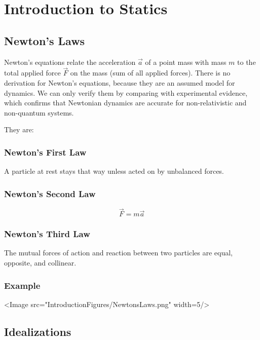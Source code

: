 \section{Introduction to Statics}

\subsection{Newton's Laws}



Newton's equations relate the acceleration $\vec{a}$ of a point mass with mass $m$ to the total applied force $\vec{F}$ on the mass (sum of all applied forces). There is no derivation for Newton's equations, because they are an assumed model for dynamics. We can only verify them by comparing with experimental evidence, which confirms that Newtonian dynamics are accurate for non-relativistic and non-quantum systems.

They are:

\subsubsection{Newton's First Law}

A particle at rest stays that way unless acted on by unbalanced forces. 

\subsubsection{Newton's Second Law}

\[\vec{F} = m \vec{a}\]

\subsubsection{Newton's Third Law}

The mutual forces of action and reaction between two particles are equal, opposite, and collinear. 

\subsubsection{Example}

<Image src="IntroductionFigures/NewtonsLaws.png" width=5/>

\subsection{Idealizations}

